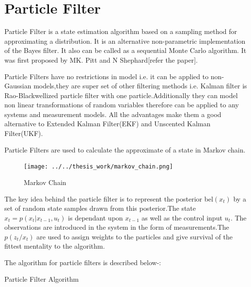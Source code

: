 \documentclass[12pt]{dalcsthesis}
\begin{document}
\section{Particle Filter}
Particle Filter is a state estimation algorithm based on a sampling method for approximating a distribution. It is an alternative non-parametric implementation of the Bayes filter. It also can be called as a sequential Monte Carlo algorithm. It was first proposed by MK. Pitt and N Shephard[refer the paper]. 

Particle Filters have no restrictions in model i.e. it can be applied to non-Gaussian models,they are super set of other filtering methods i.e. Kalman filter is Rao-Blackwellized particle filter with one particle.Additionally they can model non linear transformations of random variables therefore can be applied to any systems and measurement models. All the advantages make them a good alternative to Extended Kalman Filter(EKF) and Unscented Kalman Filter(UKF). 

Particle Filters are used to calculate the approximate of a state in Markov chain.
\begin{figure}[hbtp]
\caption{Markov Chain}
\centering
\texttt{[image: ../../thesis\_work/markov\_chain.png]}
\end{figure}
The key idea behind the particle filter is to represent the posterior bel$(x_{t})$ by a set of random state samples drawn from this posterior.The state $ x _{t}=p(x_{t}|x_{t-1},u _{t})$ is dependant upon $ x _{t-1}$ as well as the control input $u _{t}$. The observations are introduced in the system in the form of measurements.The $p(z_{t}/x_{t})$ are used to assign weights to the particles and give survival of the fittest mentality to the algorithm.  

The algorithm for particle filters is described below-:

\begin{algorithm}[H]
\label{alg:ParticleFilter}
 \SetAlgoLined
  		 


\caption{Particle Filter Algorithm}
\end{algorithm}
\end{document}
